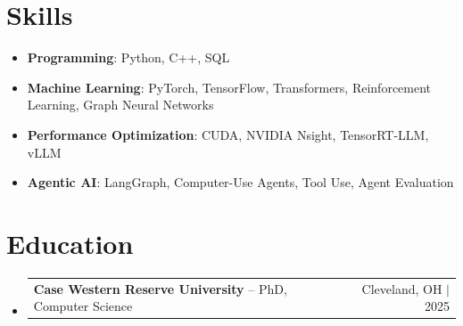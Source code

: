 \documentclass[letterpaper,13pt]{article}
\makeatletter
\newcommand{\resumeProjectHeading}[2]{
    \item
    \begin{tabular*}{\textwidth}{l@{\extracolsep{\fill}}r}
      \small#1 & #2 \\
    \end{tabular*}\vspace{-4pt}
}
\newcommand{\resumeSubHeadingListStart}{\begin{itemize}[leftmargin=0in, label={}]}
\newcommand{\resumeSubHeadingListEnd}{\end{itemize}}
\makeatother
\begin{document}
\section{Skills}
\vspace{0.02cm}
\begin{itemize}[leftmargin=0.15in, label={}, itemsep=2pt, topsep=1pt]
  \item \textbf{Programming}: Python, C++, SQL
  \item \textbf{Machine Learning}: PyTorch, TensorFlow, Transformers, Reinforcement Learning, Graph Neural Networks
  \item \textbf{Performance Optimization}: CUDA, NVIDIA Nsight, TensorRT-LLM, vLLM
  \item \textbf{Agentic AI}: LangGraph, Computer-Use Agents, Tool Use, Agent Evaluation
\end{itemize}
\vspace{0.02cm}

\section{Education}
\resumeSubHeadingListStart
  \resumeProjectHeading{\textbf{Case Western Reserve University} -- PhD, Computer Science}{Cleveland, OH $|$ 2025}
\resumeSubHeadingListEnd
\end{document}
